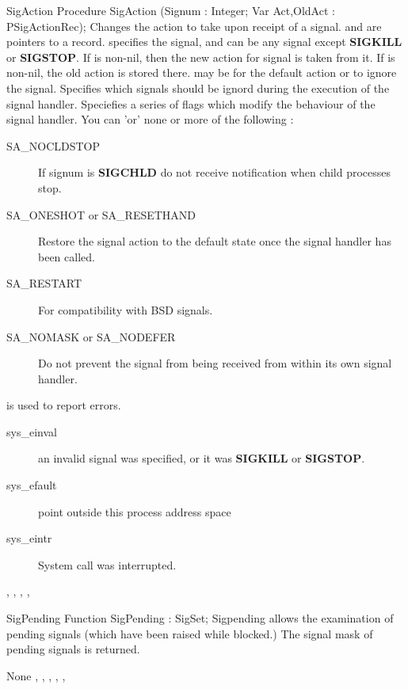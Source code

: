 \begin{procedure}{SigAction}
\Declaration
Procedure SigAction (Signum : Integer; Var Act,OldAct : PSigActionRec);
\Description
 Changes the action to take upon receipt of a signal.  and
 are pointers to a  record.
 specifies the signal, and can be any signal except
\textbf{SIGKILL} or \textbf{SIGSTOP}.
If  is non-nil, then the new action for signal  is taken
from it. If  is non-nil, the old action is stored there.
 may be  for the default action or
 to ignore the signal.
 Specifies which signals should be ignord during the execution
of the signal handler.
 Speciefies a series of flags which modify the behaviour of
the signal handler. You can 'or' none or more of the following :
\begin{description}
\item[SA\_NOCLDSTOP] If signum is \textbf{SIGCHLD} do not receive
notification when child processes stop.
\item[SA\_ONESHOT or SA\_RESETHAND] Restore the signal action to the default
state once the signal handler has been called.
\item[SA\_RESTART] For compatibility with BSD signals.
\item[SA\_NOMASK or SA\_NODEFER] Do not prevent the signal from being received
from within its own signal handler.
\end{description}

\Errors
{} is used to report errors.
\begin{description}
\item[sys\_einval] an invalid signal was specified, or it was
\textbf{SIGKILL} or \textbf{SIGSTOP}.
\item[sys\_efault]  point outside this process address space
\item[sys\_eintr] System call was interrupted.
\end{description}

\SeeAlso

, , , ,

\end{procedure}


\begin{function}{SigPending}
\Declaration
Function SigPending  : SigSet;
\Description
Sigpending allows the examination of pending signals (which have been raised
while blocked.) The signal mask of pending signals is returned.

\Errors
None
\SeeAlso
{}, , , ,
,  
\end{function}

